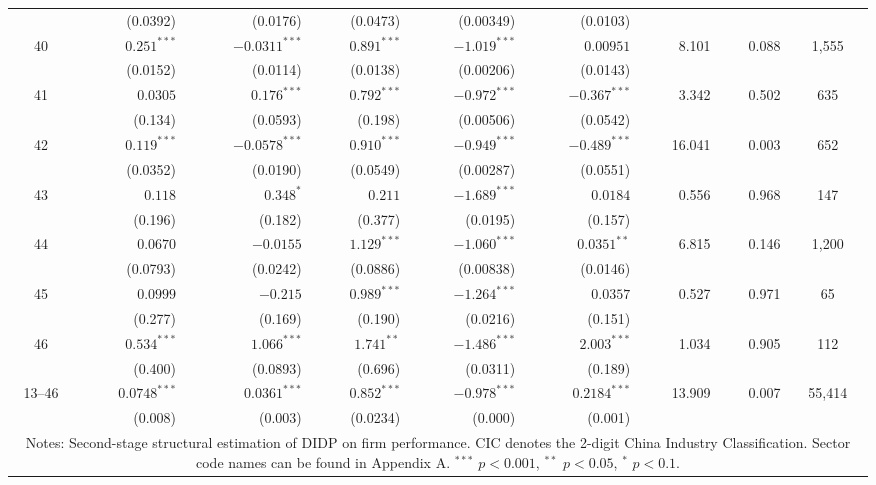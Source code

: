 \documentclass[11pt,a4paper]{article}
\begin{document}
\begin{landscape}
\begin{longtable}{crrrrrrrc}
   & (0.0392) & (0.0176) & (0.0473) & (0.00349) & (0.0103) & & & \\
40 & $0.251^{***}$ & $-0.0311^{***}$ & $0.891^{***}$ & $-1.019^{***}$ & $0.00951$ & 8.101 & 0.088 & 1{,}555 \\
   & (0.0152) & (0.0114) & (0.0138) & (0.00206) & (0.0143) & & & \\
41 & $0.0305$ & $0.176^{***}$ & $0.792^{***}$ & $-0.972^{***}$ & $-0.367^{***}$ & 3.342 & 0.502 & 635 \\
   & (0.134) & (0.0593) & (0.198) & (0.00506) & (0.0542) & & & \\
42 & $0.119^{***}$ & $-0.0578^{***}$ & $0.910^{***}$ & $-0.949^{***}$ & $-0.489^{***}$ & 16.041 & 0.003 & 652 \\
   & (0.0352) & (0.0190) & (0.0549) & (0.00287) & (0.0551) & & & \\
43 & $0.118$ & $0.348^{*}$ & $0.211$ & $-1.689^{***}$ & $0.0184$ & 0.556 & 0.968 & 147 \\
   & (0.196) & (0.182) & (0.377) & (0.0195) & (0.157) & & & \\
44 & $0.0670$ & $-0.0155$ & $1.129^{***}$ & $-1.060^{***}$ & $0.0351^{**}$ & 6.815 & 0.146 & 1{,}200 \\
   & (0.0793) & (0.0242) & (0.0886) & (0.00838) & (0.0146) & & & \\
45 & $0.0999$ & $-0.215$ & $0.989^{***}$ & $-1.264^{***}$ & $0.0357$ & 0.527 & 0.971 & 65 \\
   & (0.277) & (0.169) & (0.190) & (0.0216) & (0.151) & & & \\
46 & $0.534^{***}$ & $1.066^{***}$ & $1.741^{**}$ & $-1.486^{***}$ & $2.003^{***}$ & 1.034 & 0.905 & 112 \\
   & (0.400) & (0.0893) & (0.696) & (0.0311) & (0.189) & & & \\
\midrule
13--46 & $0.0748^{***}$ & $0.0361^{***}$ & $0.852^{***}$ & $-0.978^{***}$ & $0.2184^{***}$ & 13.909 & 0.007 & 55{,}414 \\
       & (0.008) & (0.003) & (0.0234) & (0.000) & (0.001) & & & \\
\bottomrule
\multicolumn{9}{p{\linewidth}}{\footnotesize Notes: Second-stage structural estimation of DIDP on firm performance. CIC denotes the 2-digit China Industry Classification. Sector code names can be found in Appendix A. $^{***}$ $p<0.001$, $^{**}$ $p<0.05$, $^{*}$ $p<0.1$.}
\end{longtable}
\end{landscape}
\end{document}
